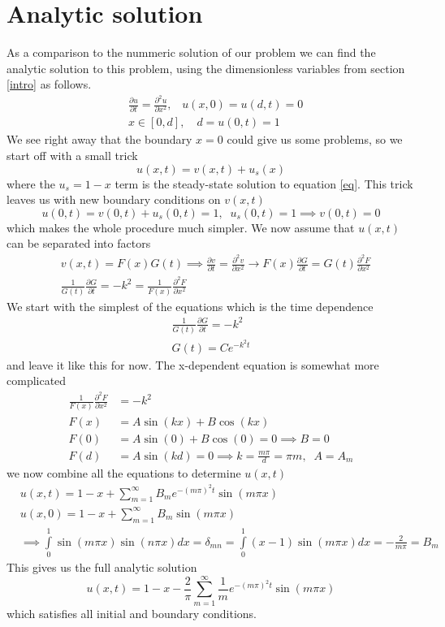 \documentclass[a4paper,english, 10pt, twoside]{article}
\begin{document}
\section{Analytic solution}\label{analytic}
As a comparison to the nummeric solution of our problem we can find the analytic solution to this problem, using the dimensionless variables
from section \ref{intro} as follows. 
 \begin{align}\label{eq}
  &\frac{\partial u}{\partial t} = \frac{\partial^2 u}{\partial x^2}, \,\,\,\,\, u(x,0) = u(d,t) = 0\\
  &x\in[0,d],\,\,\,\,\,\,  d = u(0,t) = 1
 \end{align}
We see right away that the boundary $x=0$ could give us some problems, so we start off with a small trick
$$
u(x,t) = v(x,t)  + u_s(x)
$$
where the $u_s = 1-x$ term is the steady-state solution to equation \ref{eq}. This trick leaves us with new boundary conditions 
on $v(x,t)$ 
$$
u(0,t) = v(0,t)  + u_s(0,t) = 1, \;\; u_s(0,t) = 1 \implies v(0,t) = 0
$$
which makes the whole procedure much simpler. We now assume that $u(x,t)$ can be separated into factors 
\begin{align*}
&v(x,t) = F(x)G(t) \implies \frac{\partial v}{\partial t} = \frac{\partial^2 v}{\partial x^2} \to F(x)\frac{\partial G}{\partial t}
= G(t)\frac{\partial^2 F}{\partial x^2}\\
&\frac{1}{G(t)}\frac{\partial G}{\partial t} =-k^2 =  \frac{1}{F(x)}\frac{\partial^2 F}{\partial x^2}
\end{align*}
We start with the simplest of the equations which is the time dependence
\begin{align*}
 \frac{1}{G(t)}\frac{\partial G}{\partial t} =-k^2\\
 G(t) =C e^{-k^2t}
\end{align*}
and leave it like this for now. The x-dependent equation is somewhat more complicated
\begin{align*}
 \frac{1}{F(x)}\frac{\partial^2 F}{\partial x^2} &= -k^2 \\
 F(x) &= A\sin(kx) + B\cos(kx)\\
 F(0) &= A\sin(0) + B\cos(0) = 0 \implies B= 0\\
 F(d) &= A\sin(kd) = 0 \implies k = \frac{m\pi}{d} = \pi m, \;\; A = A_m
\end{align*}
we now combine all the equations to determine $u(x,t)$
\begin{align*}
 &u(x,t) = 1-x + \sum\limits_{m=1}^{\infty}B_me^{-(m\pi)^2t}\sin(m\pi x) \\
 &u(x,0) = 1-x +\sum\limits_{m=1}^{\infty}B_m\sin(m\pi x)\\
 &\implies \int\limits_0^1\sin(m\pi x)\sin(n\pi x)dx = \delta_{mn} = \int\limits_0^1(x-1)\sin(m\pi x)dx = -\frac{2}{m\pi} = B_m
\end{align*}
This gives us the full analytic solution 
\begin{equation}\label{solution}
 u(x,t) = 1-x-\frac{2}{\pi}\sum\limits_{m = 1}^{\infty}\frac{1}{m}e^{-(m\pi)^2t}\sin(m\pi x) 
\end{equation}
which satisfies all initial and boundary conditions.
\end{document}

